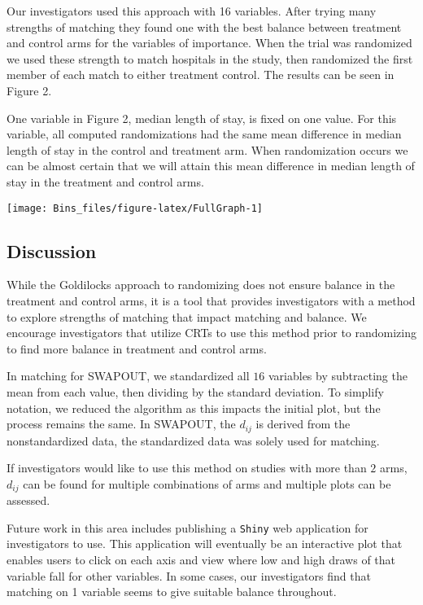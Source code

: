 \documentclass[]{sagej}
\begin{document}
Our investigators used this approach with 16 variables. After trying
many strengths of matching they found one with the best balance between
treatment and control arms for the variables of importance. When the
trial was randomized we used these strength to match hospitals in the
study, then randomized the first member of each match to either
treatment control. The results can be seen in Figure 2.

One variable in Figure 2, median length of stay, is fixed on one value.
For this variable, all computed randomizations had the same mean
difference in median length of stay in the control and treatment arm.
When randomization occurs we can be almost certain that we will attain
this mean difference in median length of stay in the treatment and
control arms.

\begin{center}\texttt{[image: Bins\_files/figure-latex/FullGraph-1]} \end{center}

\subsection{Discussion}\label{discussion}

While the Goldilocks approach to randomizing does not ensure balance in
the treatment and control arms, it is a tool that provides investigators
with a method to explore strengths of matching that impact matching and
balance. We encourage investigators that utilize CRTs to use this method
prior to randomizing to find more balance in treatment and control arms.

In matching for SWAPOUT, we standardized all \(16\) variables by
subtracting the mean from each value, then dividing by the standard
deviation. To simplify notation, we reduced the algorithm as this
impacts the initial plot, but the process remains the same. In SWAPOUT,
the \(d_{ij}\) is derived from the nonstandardized data, the
standardized data was solely used for matching.

If investigators would like to use this method on studies with more than
\(2\) arms, \(d_{ij}\) can be found for multiple combinations of arms
and multiple plots can be assessed.

Future work in this area includes publishing a \texttt{Shiny} web
application for investigators to use. This application will eventually
be an interactive plot that enables users to click on each axis and view
where low and high draws of that variable fall for other variables. In
some cases, our investigators find that matching on 1 variable seems to
give suitable balance throughout.
\end{document}
